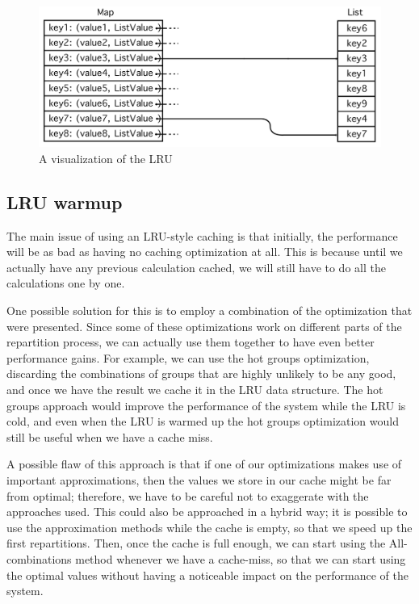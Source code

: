 \begin{figure}[!htb]
  \centering
  \includegraphics[width=\textwidth,height=\textheight,keepaspectratio]{img/lru.png}
  \caption{A visualization of the LRU}
  \label{fig:lru}
\end{figure}

\subsection{LRU warmup}\label{sec:warmup}
The main issue of using an LRU-style caching is that initially, the performance will be as bad as having no caching optimization at all. This is because until we actually have any previous calculation cached, we will still have to do all the calculations one by one. 

One possible solution for this is to employ a combination of the optimization that were presented. Since some of these optimizations work on different parts of the repartition process, we can actually use them together to have even better performance gains. For example, we can use the hot groups optimization, discarding the combinations of groups that are highly unlikely to be any good, and once we have the result we cache it in the LRU data structure. The hot groups approach would improve the performance of the system while the LRU is cold, and even when the LRU is warmed up the hot groups optimization would still be useful when we have a cache miss.

A possible flaw of this approach is that if one of our optimizations makes use of important approximations, then the values we store in our cache might be far from optimal; therefore, we have to be careful not to exaggerate with the approaches used. This could also be approached in a hybrid way; it is possible to use the approximation methods while the cache is empty, so that we speed up the first repartitions. Then, once the cache is full enough, we can start using the All-combinations method whenever we have a cache-miss, so that we can start using the optimal values without having a noticeable impact on the performance of the system.

